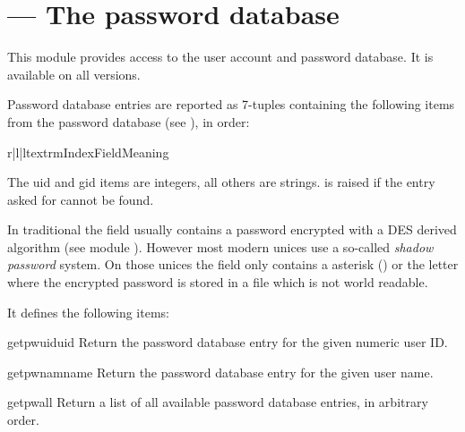 \section{ ---
         The password database}


This module provides access to the \UNIX{} user account and password
database.  It is available on all \UNIX{} versions.

Password database entries are reported as 7-tuples containing the
following items from the password database (see ), in order:

\begin{tableiii}{r|l|l}{textrm}{Index}{Field}{Meaning}
\end{tableiii}

The uid and gid items are integers, all others are strings.
 is raised if the entry asked for cannot be found.

 In traditional \UNIX{} the field  usually
contains a password encrypted with a DES derived algorithm (see module
).  However most modern unices 
use a so-called \emph{shadow password} system.  On those unices the
field  only contains a asterisk () or the 
letter  where the encrypted password is stored in a file
 which is not world readable.

It defines the following items:

\begin{funcdesc}{getpwuid}{uid}
Return the password database entry for the given numeric user ID.
\end{funcdesc}

\begin{funcdesc}{getpwnam}{name}
Return the password database entry for the given user name.
\end{funcdesc}

\begin{funcdesc}{getpwall}{}
Return a list of all available password database entries, in arbitrary order.
\end{funcdesc}


\begin{seealso}
\end{seealso}
